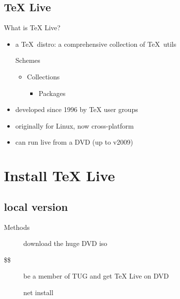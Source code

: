 \documentclass{beamer}
\def\TeXLive{\TeX{} Live\xspace}
\let\TL=\TeXLive
\begin{document}
\subsection{\TeXLive}

\begin{frame}{What is \TL ?}
  \begin{itemize}
    \item a \TeX\ distro: a comprehensive collection of \TeX\ utils

      Schemes
      \begin{itemize}
        \item Collections
          \begin{itemize}
            \item Packages
          \end{itemize}
      \end{itemize}

    \item developed since 1996 by TeX user groups
    \item originally for Linux, now cross-platform
    \item can run live from a DVD (up to v2009)
  \end{itemize}
\end{frame}

\section{Install \TL}
\subsection{local version}
\begin{frame}{Methods}
  \begin{description}
    \item[\frownie] download the huge DVD iso
      \pause
    \item[\$\$] be a member of TUG and get \TL on DVD
      \pause
    \item[\smiley] net install
  \end{description}
\end{frame}
\end{document}
